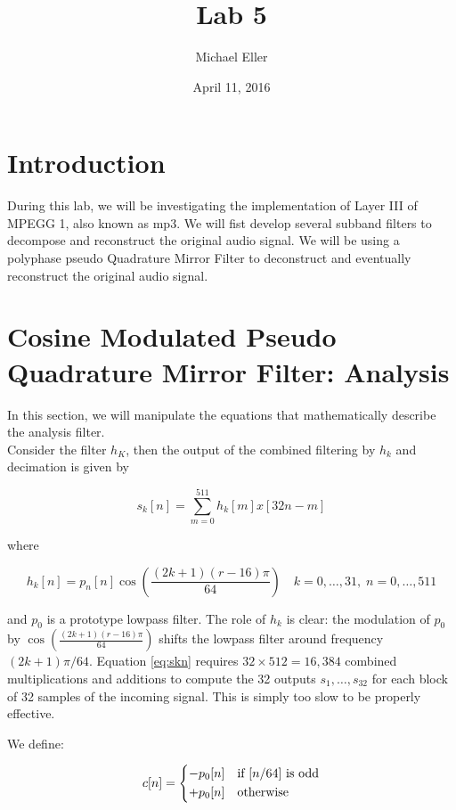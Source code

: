 \documentclass{article} %
\title{Lab 5}
\author{Michael Eller}
\date{April 11, 2016} %
\begin{document}
\maketitle

\tableofcontents
\clearpage
\section{Introduction}

During this lab, we will be investigating the implementation of Layer III
of MPEGG 1, also known as mp3. We will fist develop several subband
filters to decompose and reconstruct the original audio signal. We will
be using a polyphase pseudo Quadrature Mirror Filter to deconstruct
and eventually reconstruct the original audio signal. 

\section{Cosine Modulated Pseudo Quadrature Mirror Filter: Analysis}

In this section, we will manipulate the equations that mathematically
describe the analysis filter. \\


Consider the filter $h_K$, then the output of the combined filtering by $h_k$
and decimation is given by

\begin{equation}
\label{eq:skn}
s_k[n]=\sum\limits_{m=0}^{511} h_k[m]x[32n-m]
\end{equation}

where

\begin{equation}
\label{eq:hkn2}
h_k[n]=p_n[n] \cos \left( \frac{(2k+1)(r-16)\pi}{64}\right)
\quad k=0,\dots,31, \; n=0,\dots,511
\end{equation}

and $p_0$ is a prototype lowpass filter. The role of $h_k$ is clear: the
modulation of $p_0$ by $\cos \left( \frac{(2k+1)(r-16)\pi}{64}\right)$ shifts
the lowpass filter around frequency $(2k+1)\pi/64$. 
Equation \ref{eq:skn} requires $32 \times 512 = 16,384$ combined multiplications
and additions to compute the 32 outputs $s_{1},\dots,s_{32}$ for each block
of 32 samples of the incoming signal. This is simply too slow to be properly
effective. 



We define:

\begin{equation}
\label{eq:cn}
c[n]=
\begin{dcases*}
-p_0[n] & if $[n/64]$ is odd\\
+p_0[n]  & otherwise
\end{dcases*}
\end{equation}
\end{document}
